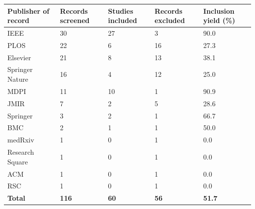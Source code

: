 \begin{tabular}{L{3.7cm} C{2.3cm} C{2.3cm} C{2.3cm} C{2.4cm}}
\toprule
\textbf{Publisher of record} & \textbf{Records screened} & \textbf{Studies included} & \textbf{Records excluded} & \textbf{Inclusion yield (\%)} \\
\midrule
IEEE & 30 & 27 & 3 & 90.0 \\
PLOS & 22 & 6 & 16 & 27.3 \\
Elsevier & 21 & 8 & 13 & 38.1 \\
Springer Nature & 16 & 4 & 12 & 25.0 \\
MDPI & 11 & 10 & 1 & 90.9 \\
JMIR & 7 & 2 & 5 & 28.6 \\
Springer & 3 & 2 & 1 & 66.7 \\
BMC & 2 & 1 & 1 & 50.0 \\
medRxiv & 1 & 0 & 1 & 0.0 \\
Research Square & 1 & 0 & 1 & 0.0 \\
ACM & 1 & 0 & 1 & 0.0 \\
RSC & 1 & 0 & 1 & 0.0 \\
\midrule
\textbf{Total} & \textbf{116} & \textbf{60} & \textbf{56} & \textbf{51.7} \\
\bottomrule
\end{tabular}